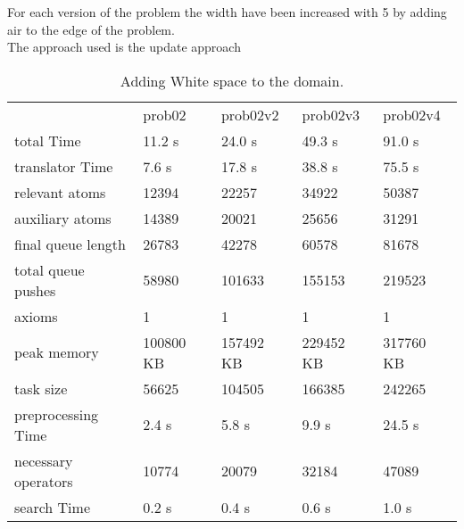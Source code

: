 			
			\begin{table}[h]
				\centering
				\caption{Adding White space to the domain.}
				 For each version of the problem the width have been increased with 5 by adding air to the edge of the problem.\\ The approach used is the update approach
				\label{whitespace}
				\begin{tabular}{lllll}
					& prob02 & prob02v2 & prob02v3 & prob02v4\\
					total Time & 11.2 s& 24.0 s& 49.3 s& 91.0 s\\
					translator Time& 7.6 s& 17.8 s& 38.8 s & 75.5 s\\
					
					relevant atoms & 12394 & 22257 & 34922  & 50387\\
					auxiliary atoms &14389 & 20021 & 25656  & 31291\\
					final queue length &26783 & 42278 &60578  & 81678\\
					total queue pushes & 58980 & 101633 & 155153 & 219523\\
					axioms & 1 & 1  & 1 & 1 \\ 
					peak memory & 100800 KB & 157492 KB & 229452 KB& 317760 KB\\ 
					task size & 56625 &  104505 & 166385 & 242265\\
					
					
					preprocessing Time& 2.4 s& 5.8 s& 9.9 s & 24.5 s \\
					necessary operators & 10774 & 20079  & 32184 & 47089\\
					search Time & 0.2 s& 0.4 s& 0.6 s& 1.0 s\\
				\end{tabular}
			\end{table}
			
